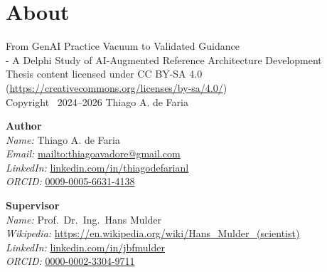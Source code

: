 \newpage\thispagestyle{empty}\mbox{}\newpage

\section*{About}

{\footnotesize
\noindent From GenAI Practice Vacuum to Validated Guidance\\
- A Delphi Study of AI-Augmented Reference Architecture Development\\
Thesis content licensed under CC BY-SA 4.0 (\url{https://creativecommons.org/licenses/by-sa/4.0/})\\
Copyright \textcopyright\ 2024--2026 Thiago A. de Faria

\vspace{0.2cm}

\noindent\hspace{0.2cm}\textbf{Author}\\
\noindent\hspace{0.2cm}\textit{Name:} Thiago A. de Faria\\
\noindent\hspace{0.2cm}\textit{Email:} \href{mailto:thiagoavadore@gmail.com}{mailto:thiagoavadore@gmail.com}\\
\noindent\hspace{0.2cm}\textit{LinkedIn:} \href{https://www.linkedin.com/in/thiagodefarianl/}{linkedin.com/in/thiagodefarianl}\\
\noindent\hspace{0.2cm}\textit{ORCID:} \href{https://orcid.org/0009-0005-6631-4138}{0009-0005-6631-4138}

\vspace{0.2cm}

\noindent\hspace{0.2cm}\textbf{Supervisor}\\
\noindent\hspace{0.2cm}\textit{Name:} Prof.\ Dr.\ Ing.\ Hans Mulder\\
\noindent\hspace{0.2cm}\textit{Wikipedia:} \href{https://en.wikipedia.org/wiki/Hans_Mulder_(scientist)}{https://en.wikipedia.org/wiki/Hans\_Mulder\_(scientist)}\\
\noindent\hspace{0.2cm}\textit{LinkedIn:} \href{https://www.linkedin.com/in/jbfmulder/}{linkedin.com/in/jbfmulder}\\
\noindent\hspace{0.2cm}\textit{ORCID:} \href{https://orcid.org/0000-0002-3304-9711}{0000-0002-3304-9711}

}
